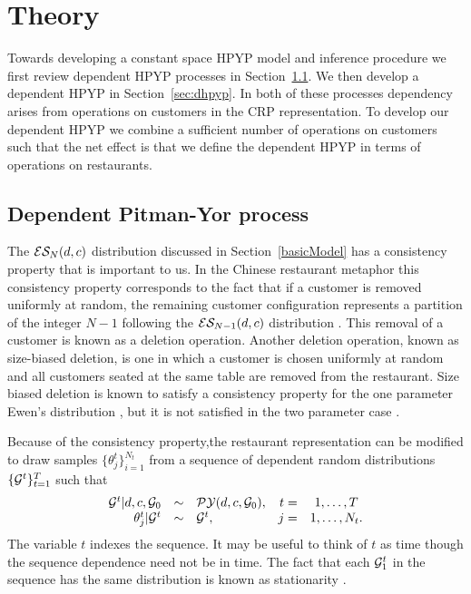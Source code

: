 \section{Theory}
\label{sec:theory}

Towards developing a constant space HPYP model and inference procedure we first review dependent HPYP processes in Section~\ref{sec:dpyp}.  We then develop a dependent HPYP in Section~\ref{sec:dhpyp}. In both of these processes dependency arises from operations on customers in the CRP representation. To develop our dependent HPYP we combine a sufficient number of operations on customers such that the net effect is that we define the dependent HPYP in terms of operations on restaurants.


\subsection{Dependent Pitman-Yor process} 
\label{sec:dpyp}

The $\ES_N(d,c)$ distribution discussed in Section~\ref{basicModel} has a consistency property that is important to us. In the Chinese restaurant metaphor this consistency property corresponds to the fact that if a customer is removed uniformly at random, the remaining customer configuration represents a partition of the integer $N-1$ following the $\ES_{N-1}(d,c)$ distribution \cite{Pitman1995}.  This removal of a customer is known as a deletion operation.  Another deletion operation, known as size-biased deletion, is one in which a customer is chosen uniformly at random and all customers seated at the same table are removed from the restaurant. Size biased deletion is known to satisfy a consistency property for the one parameter Ewen's distribution \cite{Kingman1978}, but it is not satisfied in the two parameter case \cite{Pitman1995}.

Because of the  consistency property,the restaurant representation can be modified to draw samples  $\{ \theta_j^t \}_{i = 1}^{N_t}$ from a sequence of dependent random distributions $\{ \G^t \}_{t=1}^T$ such that 
%
\begin{equation}
\begin{array}{rclrcr}
\G^t | d, c, \G_0 &\sim& \PY(d,c,\G_0),  & t =&1, \dots, T\\
 \label{eqnDependentPY2}  \theta_j^t | \G^t &\sim& \G^t, & j =&1, \dots ,N_t.
 \end{array}
 \end{equation}
The variable $t$ indexes the sequence.  It may be useful to think of $t$ as time though the sequence dependence need not be in time. The fact that each $\G^t_1$ in the sequence has the same distribution is known as stationarity \cite{Brockwell1991}.  
 
